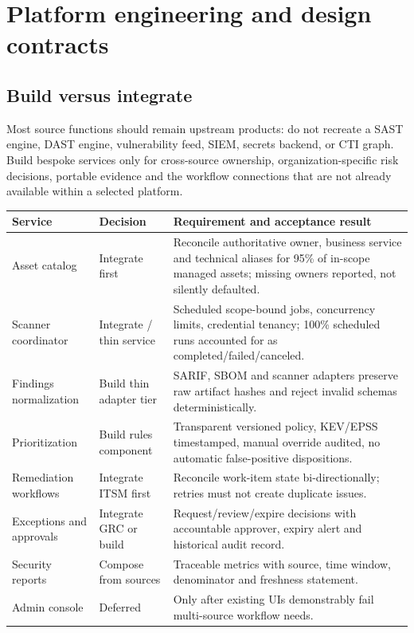 \documentclass[11pt,oneside]{report}
\begin{document}
\chapter{Platform engineering and design contracts}
\section{Build versus integrate}
Most source functions should remain upstream products: do not recreate a SAST engine, DAST engine, vulnerability feed, SIEM, secrets backend, or CTI graph. Build bespoke services only for cross-source ownership, organization-specific risk decisions, portable evidence and the workflow connections that are not already available within a selected platform.

\noindent\begin{tabularx}{\textwidth}{P{0.23\textwidth}P{0.14\textwidth}Y}
\toprule Service & Decision & Requirement and acceptance result\\\midrule
Asset catalog & Integrate first & Reconcile authoritative owner, business service and technical aliases for 95\% of in-scope managed assets; missing owners reported, not silently defaulted.\\
Scanner coordinator & Integrate / thin service & Scheduled scope-bound jobs, concurrency limits, credential tenancy; 100\% scheduled runs accounted for as completed/failed/canceled.\\
Findings normalization & Build thin adapter tier & SARIF, SBOM and scanner adapters preserve raw artifact hashes and reject invalid schemas deterministically.\\
Prioritization & Build rules component & Transparent versioned policy, KEV/EPSS timestamped, manual override audited, no automatic false-positive dispositions.\\
Remediation workflows & Integrate ITSM first & Reconcile work-item state bi-directionally; retries must not create duplicate issues.\\
Exceptions and approvals & Integrate GRC or build & Request/review/expire decisions with accountable approver, expiry alert and historical audit record.\\
Security reports & Compose from sources & Traceable metrics with source, time window, denominator and freshness statement.\\
Admin console & Deferred & Only after existing UIs demonstrably fail multi-source workflow needs.\\
\bottomrule
\end{tabularx}
\end{document}
